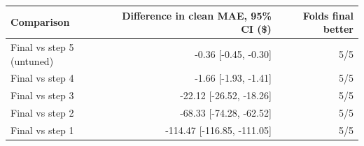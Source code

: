 \begin{tabular}{lrr}
\toprule
Comparison & Difference in clean MAE, 95\% CI (\$) & Folds final better \\
\midrule
Final vs step 5 (untuned) & -0.36 [-0.45, -0.30] & 5/5 \\
Final vs step 4 & -1.66 [-1.93, -1.41] & 5/5 \\
Final vs step 3 & -22.12 [-26.52, -18.26] & 5/5 \\
Final vs step 2 & -68.33 [-74.28, -62.52] & 5/5 \\
Final vs step 1 & -114.47 [-116.85, -111.05] & 5/5 \\
\bottomrule
\end{tabular}
